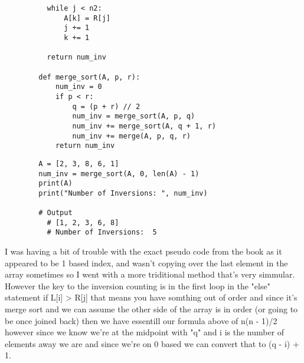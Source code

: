 \documentclass{article}
\begin{document}
\begin{enumerate}
\begin{enumerate}
\begin{lstlisting}
          while j < n2: 
              A[k] = R[j] 
              j += 1
              k += 1
          
          return num_inv
              
        def merge_sort(A, p, r):
            num_inv = 0
            if p < r:
                q = (p + r) // 2
                num_inv = merge_sort(A, p, q)
                num_inv += merge_sort(A, q + 1, r)
                num_inv += merge(A, p, q, r)            
            return num_inv
      \end{lstlisting}
      \begin{lstlisting}
        A = [2, 3, 8, 6, 1]
        num_inv = merge_sort(A, 0, len(A) - 1)
        print(A)
        print("Number of Inversions: ", num_inv)

        # Output
          # [1, 2, 3, 6, 8]
          # Number of Inversions:  5
      \end{lstlisting}
      I was having a bit of trouble with the exact pseudo code from the book as it appeared to be 1 based index, and wasn't copying over the last element in the array sometimes so I went with a more triditional method that's very simmular. However the key to the inversion counting is in the first loop in the "else" statement if L[i] > R[j] that means you have somthing out of order and since it's merge sort and we can assume the other side of the array is in order (or going to be once joined back) then we have essentill our formula above of n(n - 1)/2 however since we know we're at the midpoint with "q" and i is the number of elements away we are and since we're on 0 based we can convert that to (q - i) + 1.
    \end{enumerate}


\end{enumerate}
\end{document}

